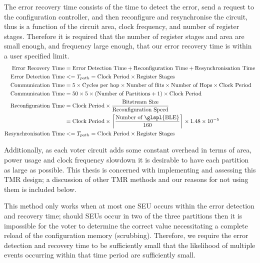\documentclass[12pt,final,oneside]{dwThesis} %
\begin{document}
   The error recovery time consists of the time to detect the error, send a
   request to the configuration controller, and then reconfigure and
   resynchronise the circuit, thus is a function of the circuit area, clock
   frequency, and number of register stages. Therefore it is required that the
   number of register stages and area are small enough, and frequency large
   enough, that our error recovery time is within a user specified limit.
   \begin{align} \mbox{Error Recovery Time} &=\mbox{Error Detection Time} +
      \mbox{Reconfiguration Time} + \mbox{Resynchronisation Time}\notag\\
      \mbox{Error Detection Time} &<= T_{path} = \mbox{Clock
         Period}\times\mbox{Register Stages}\notag\\ \mbox{Communication Time}
      &= 5\times \mbox{Cycles per hop}\times\mbox{Number of
         flits}\times\mbox{Number of Hops}\times \mbox{Clock Period}\notag\\
      \mbox{Communication Time} &= 50\times 5\times (\mbox{Number of
         Partitions}+1)\times \mbox{Clock Period}\notag\\ \mbox{Reconfiguration
         Time} &= \mbox{Clock Period}\times \frac{\mbox{Bitstream
            Size}}{\mbox{Reconfiguration Speed}}\notag\\ &= \mbox{Clock
         Period}\times \left\lceil \frac{\mbox{Number of
            \glspl{BLE}}}{160}\right\rceil\times 1.48\times10^{-5}\notag\\
      \mbox{Resynchronisation Time} &<= T_{path} = \mbox{Clock
         Period}\times\mbox{Register Stages}\notag\\ \end{align}

   Additionally, as each voter circuit adds some constant overhead in terms of
   area, power usage and clock frequency slowdown it is desirable to have each
   partition as large as possible. This thesis is concerned with implementing
   and assessing this \gls{TMR} design; a discussion of other \gls{TMR} methods
   and our reasons for not using them is included below.

   This method only works when at most one \gls{SEU} occurs within the error
   detection and recovery time; should \glspl{SEU} occur in two of the three
   partitions then it is impossible for the voter to determine the correct
   value necessitating a complete reload of the configuration memory
   (\gls{scrubbing}). Therefore, we require the error detection and recovery
   time to be sufficiently small that the likelihood of multiple events
   occurring within that time period are sufficiently small.
\end{document}
